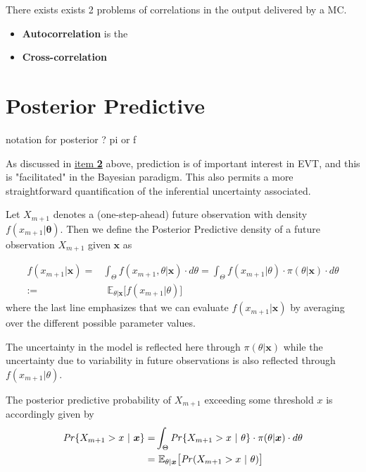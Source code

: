 There exists exists 2 problems of correlations in the output delivered by a MC. 

\begin{itemize}
	\item \textbf{Autocorrelation} is the
	\item \textbf{Cross-correlation}
\end{itemize}


\section{Posterior Predictive}
notation for posterior ? pi or f


As discussed in \hyperref[it2bayes]{item \textbf{2}} above, prediction is of important interest in EVT, and this is "facilitated" in the Bayesian paradigm. This also permits a more straightforward quantification of the inferential uncertainty associated.

\begin{definition}
	Let $X_{m+1}$ denotes a (one-step-ahead) future observation with density $f(x_{m+1}|\boldsymbol{\theta})$. Then we define the Posterior Predictive density of a future observation $X_{m+1}$ given $\boldsymbol{x}$ as 
	
	\begin{equation}
	\begin{aligned}
	f(x_{m+1}|\boldsymbol{x})
	= & \int_{\Theta}f(x_{m+1},\theta | \boldsymbol{x})\cdot d\theta=\int_{\Theta} f(x_{m+1}|\theta)\cdot \pi (\theta|\boldsymbol{x})\cdot d\theta
	\\ := & \ \ \mathbb{E}_{\theta|\boldsymbol{x}}\big[f(x_{m+1}|\theta)\big]
	\end{aligned}
	\end{equation}
	where the last line emphasizes that we can evaluate $f(x_{m+1}|\boldsymbol{x})$ by averaging over the different possible parameter values.
	
\end{definition}

The uncertainty in the model is reflected here through $\pi(\theta|\boldsymbol{x})$ while the uncertainty due to variability in future observations is also reflected through $f(x_{m+1}|\theta)$.

\begin{definition}
	The posterior predictive probability of $X_{m+1}$ exceeding some threshold $x$ is accordingly given by
	\begin{equation}
	\begin{aligned}
	\text{\emph{Pr}}\{X_{m+1}>x\ | \ \boldsymbol{x}\}= &\int_{\Theta}\text{\emph{Pr}}\{X_{m+1}>x \ | \ \theta \} \cdot \pi(\theta|\boldsymbol{x})\cdot d\theta \\ 
	= & \ \mathbb{E}_{\theta|\boldsymbol{x}}\big[\text{\emph{Pr}}(X_{m+1}>x \ | \ \theta)\big]
	\end{aligned}
	\end{equation}
\end{definition}

